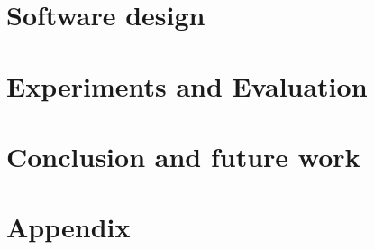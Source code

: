 \documentclass[12pt,oneside]{report} %
\begin{document}
\chapter{Software design}








\chapter{Experiments and Evaluation}




\chapter{Conclusion and future work}





\chapter{Appendix}

\end{document}
